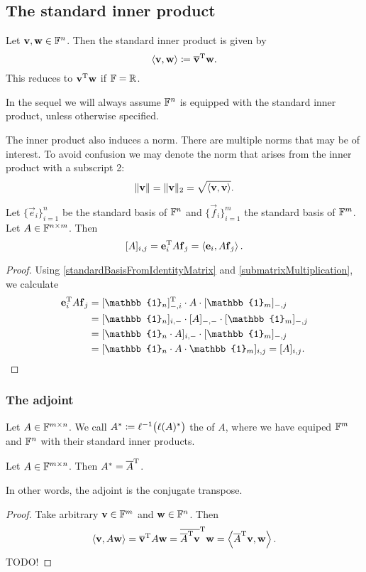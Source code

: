 \subsection{The standard inner product}
Let $\boldsymbol{\mathrm{v}},\boldsymbol{\mathrm{w}}\in\mathbb{F}^n$. Then the standard inner product is given by
\[ \left\langle \boldsymbol{\mathrm{v}},\boldsymbol{\mathrm{w}} \right\rangle \coloneqq \overline{\boldsymbol{\mathrm{v}}}^{\mathrm{T}} \boldsymbol{\mathrm{w}}. \]
This reduces to $\boldsymbol{\mathrm{v}}^{\mathrm{T}}\boldsymbol{\mathrm{w}}$ if $\mathbb{F} = \mathbb{R}$.

In the sequel we will always assume $\mathbb{F}^n$ is equipped with the standard inner product, unless otherwise specified.

The inner product also induces a norm. There are multiple norms that may be of interest. To avoid confusion we may denote the norm that arises from the inner product with a subscript 2:
\[ \lVert\boldsymbol{\mathrm{v}}\rVert = \lVert\boldsymbol{\mathrm{v}}\rVert_2 = \sqrt{\left\langle \boldsymbol{\mathrm{v}},\boldsymbol{\mathrm{v}} \right\rangle}. \]

\begin{lemma} \label{componentsFromStandardInnerProduct}
Let $\{\vec{e}_i\}_{i=1}^n$ be the standard basis of $\mathbb{F}^n$ and $\{\vec{f}_i\}_{i=1}^m$ the standard basis of $\mathbb{F}^m$. Let $A\in\mathbb{F}^{n\times m}$. Then
\[ [A]_{i,j} = \boldsymbol{\mathrm{e}}^{\mathrm{T}}_i A \boldsymbol{\mathrm{f}}_j = \left\langle \boldsymbol{\mathrm{e}}_i, A\boldsymbol{\mathrm{f}}_j \right\rangle. \]
\end{lemma}
\begin{proof}
Using \ref{standardBasisFromIdentityMatrix} and \ref{submatrixMultiplication}, we calculate
\begin{align*}
\vec{e}^\transp_i A \vec{f}_j &= [\mathbb{1}_n]_{-,i}^\transp \cdot A \cdot [\mathbb{1}_m]_{-,j} \\
&= [\mathbb{1}_n]_{i, -} \cdot [A]_{-,-} \cdot [\mathbb{1}_m]_{-,j} \\
&= [\mathbb{1}_n\cdot A]_{i,-}\cdot [\mathbb{1}_m]_{-,j} \\
&= [\mathbb{1}_n\cdot A\cdot\mathbb{1}_m]_{i,j} = [A]_{i,j}.
\end{align*}
\end{proof}

\subsubsection{The adjoint}
\begin{definition}
Let $A\in \mathbb{F}^{m\times n}$. We call $A^* \coloneqq \ell^{-1}\big(\ell(A)^*\big)$ the  of $A$, where we have equiped $\mathbb{F}^m$ and $\mathbb{F}^n$ with their standard inner products.
\end{definition}

\begin{lemma}
Let $A\in \mathbb{F}^{m\times n}$. Then $A^* = \overline{A}^{\mathrm{T}}$.
\end{lemma}
In other words, the adjoint is the conjugate transpose.
\begin{proof}
Take arbitrary $\boldsymbol{\mathrm{v}}\in\mathbb{F}^m$ and $\boldsymbol{\mathrm{w}}\in\mathbb{F}^n$. Then
\[ \left\langle \boldsymbol{\mathrm{v}}, A\boldsymbol{\mathrm{w}} \right\rangle = \overline{\boldsymbol{\mathrm{v}}}^{\mathrm{T}} A\boldsymbol{\mathrm{w}} = \overline{\overline{A}^{\mathrm{T}}\boldsymbol{\mathrm{v}}}^{\mathrm{T}}\boldsymbol{\mathrm{w}} = \left\langle \overline{A}^{\mathrm{T}}\boldsymbol{\mathrm{v}}, \boldsymbol{\mathrm{w}} \right\rangle. \]
TODO!
\end{proof}

